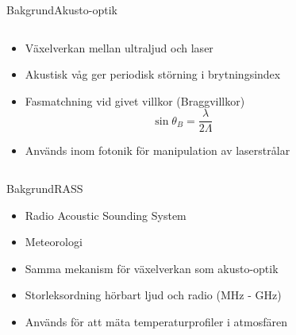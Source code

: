 \documentclass[11pt, final]{beamer}
\begin{document}
	\begin{frame}{Bakgrund}{Akusto-optik}
		\begin{columns}
			\begin{column}{0.6\textwidth}
				\begin{itemize}
					\item<1-> Växelverkan mellan ultraljud och laser
					\item<2-> Akustisk våg ger periodisk störning i brytningsindex
					\item<3-> Fasmatchning vid givet villkor (Braggvillkor)
					\begin{equation*}
						\sin{\theta_B} = \frac{\lambda}{2\Lambda}
					\end{equation*}
					\item<4-> Används inom fotonik för manipulation av laserstrålar
				\end{itemize}
			\end{column}
			\begin{column}{0.4\textwidth}
				\uncover<3->{
					\resizebox{\textwidth}{!}{
						
					}
				}
			\end{column}
		\end{columns}
	\end{frame}
	
	\begin{frame}{Bakgrund}{RASS}
		\begin{itemize}
			\item Radio Acoustic Sounding System
			\pause
			\item Meteorologi
			\pause
			\item Samma mekanism för växelverkan som akusto-optik
			\pause
			\item Storleksordning hörbart ljud och radio (MHz - GHz)
			\pause
			\item Används för att mäta temperaturprofiler i atmosfären
		\end{itemize}
	\end{frame}

	
\end{document}
